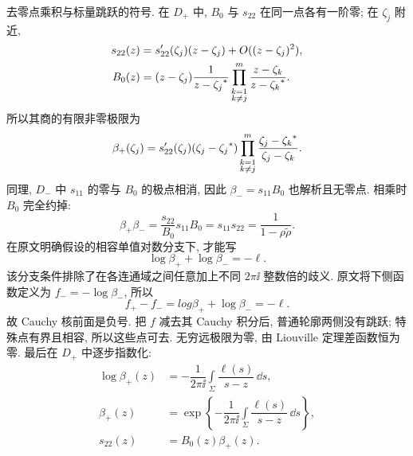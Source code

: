 
\par\smallskip\noindent 去零点乘积与标量跳跃的符号.\quad
在 $D_+$ 中, $B_0$ 与 $s_{22}$ 在同一点各有一阶零;
在 $\zeta_j$ 附近,
\begin{equation*}
\begin{aligned}
s_{22}(z)&=s_{22}'(\zeta_j)(z-\zeta_j)+O((z-\zeta_j)^2),\\
B_0(z)&=(z-\zeta_j)
\dfrac{1}{z-{\zeta_j}^{*}}
\prod\limits_{\substack{k=1\\k\ne j}}^{m}
\dfrac{z-\zeta_k}{z-{\zeta_k}^{*}}.
\end{aligned}
\end{equation*}
所以其商的有限非零极限为
\begin{equation*}
\beta_+(\zeta_j)
=s_{22}'(\zeta_j)(\zeta_j-{\zeta_j}^{*})
\prod\limits_{\substack{k=1\\k\ne j}}^{m}
\dfrac{\zeta_j-{\zeta_k}^{*}}{\zeta_j-\zeta_k}.
\end{equation*}
同理, $D_-$ 中 $s_{11}$ 的零与 $B_0$ 的极点相消,
因此 $\beta_-=s_{11}B_0$ 也解析且无零点.
相乘时 $B_0$ 完全约掉:
\begin{equation*}
\beta_+\beta_-
=\dfrac{s_{22}}{B_0}s_{11}B_0
=s_{11}s_{22}
=\dfrac{1}{1-\rho\widetilde\rho}.
\end{equation*}
在原文明确假设的相容单值对数分支下, 才能写
\begin{equation*}
\log\beta_++\log\beta_-=-\ell.
\end{equation*}
该分支条件排除了在各连通域之间任意加上不同 $2\pi\ii$ 整数倍的歧义.
原文将下侧函数定义为 $f_-=-\log\beta_-$, 所以
\begin{equation*}
f_+-f_-=log\beta_++\log\beta_-=-\ell.
\end{equation*}
故 Cauchy 核前面是负号.
把 $f$ 减去其 Cauchy 积分后, 普通轮廓两侧没有跳跃;
特殊点有界且相容, 所以这些点可去.
无穷远极限为零, 由 Liouville 定理差函数恒为零.
最后在 $D_+$ 中逐步指数化:
\begin{equation*}
\begin{aligned}
\log\beta_+(z)
&=-\dfrac{1}{2\pi\ii}\int\limits_\Sigma
\dfrac{\ell(s)}{s-z}\,\dd s,\\
\beta_+(z)
&=\exp\left\{-\dfrac{1}{2\pi\ii}\int\limits_\Sigma
\dfrac{\ell(s)}{s-z}\,\dd s\right\},\\
s_{22}(z)&=B_0(z)\beta_+(z).
\end{aligned}
\end{equation*}

